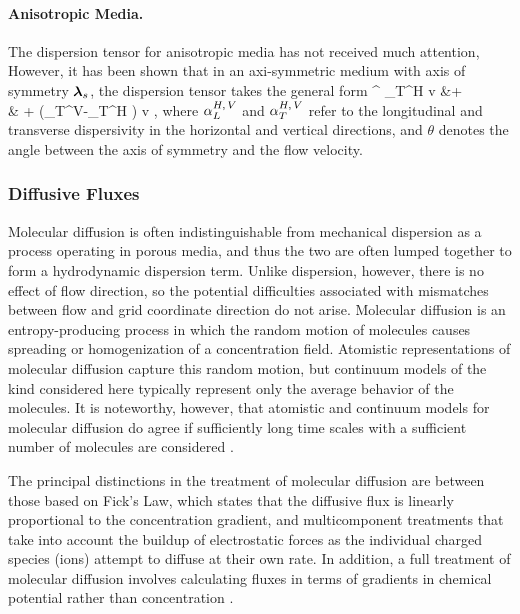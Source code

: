 \paragraph{Anisotropic Media.}

The dispersion tensor for anisotropic media has not received much attention,  However, it has been shown that in an axi-symmetric medium with axis of symmetry $\boldsymbol{\lambda}_s$, the dispersion tensor takes the general form \citep{lichtner_2002}
\BA     \label{gendisp}
\bD^{} \eq \a_T^H v \bI &+   \nonumber\\
& + \left(\a_T^V-\a_T^H \right) v ,
\EA
where ${\alpha}_L^{H,\,V}$ and ${\alpha}_T^{H,\,V}$ refer to the longitudinal and transverse dispersivity in the horizontal and vertical directions, and $\theta$ denotes the angle between the axis of symmetry and the flow velocity.




\subsubsection{Diffusive Fluxes} 
\label{sec:transport-diffusion}


\noindent Molecular diffusion is often indistinguishable from mechanical dispersion as a process operating in porous media, and thus the two are often lumped together to form a hydrodynamic dispersion term.  Unlike dispersion, however, there is no effect of flow direction, so the potential difficulties associated with mismatches between flow and grid coordinate direction do not arise.  Molecular diffusion is an entropy-producing process in which the random motion of molecules causes spreading or homogenization of a concentration field.  Atomistic representations of molecular diffusion capture this random motion, but continuum models of the kind considered here typically represent only the average behavior of the molecules.  It is noteworthy, however, that atomistic and continuum models for molecular diffusion do agree if sufficiently long time scales with a sufficient number of molecules are considered \citep{bourg2008modeling}.

\noindent The principal distinctions in the treatment of molecular diffusion are between those based on Fick's Law, which states that the diffusive flux is linearly proportional to the concentration gradient, and multicomponent treatments that take into account the buildup of electrostatic forces as the individual charged species (ions) attempt to diffuse at their own rate.  In addition, a full treatment of molecular diffusion involves calculating fluxes in terms of gradients in chemical potential rather than concentration \citep{steefel2009fluid}.

